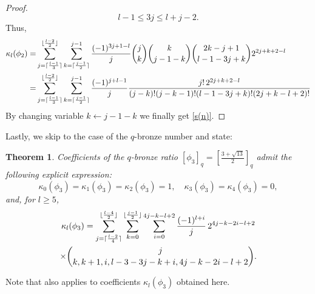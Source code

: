 \documentclass[11pt,reqno]{amsart}
\theoremstyle{plain}
\newtheorem{theoreme}[lemme]{Theorem}
\theoremstyle{definition}
\numberwithin{figure}{section}
\numberwithin{table}{section}
\numberwithin{equation}{section}
\newcommand\ka{\kappa}
\let\fr=\frac
\DeclarePairedDelimiter{\ceil}{\lceil}{\rceil}%
\DeclarePairedDelimiter{\floor}{\lfloor}{\rfloor}%
\begin{document}
\begin{proof}
\begin{equation*}
l-1≤3j≤l+j-2.
\end{equation*}
Thus,
\begin{align*}
\ka_l(\phi_2)=&\sum_{j=\ceil{\fr{l-1}{3}}}^{\floor{\fr{l-2}{2}}}\sum_{k=\ceil{\fr{j-1}{2}}}^{j-1}
\fr {(-1)^{3j+1-l}}{j}\binom{j}{k}\binom{k}{j-1-k}\binom{2k-j+1}{l-1-3j+k}2^{2j+k+2-l}\\
=&\sum_{j=\ceil{\fr{l-1}{3}}}^{\floor{\fr{l-2}{2}}}\sum_{k=\ceil{\fr{j-1}{2}}}^{j-1}
\fr {(-1)^{j+l-1}}{j}\fr{j!\,2^{2j+k+2-l}}{(j-k)!(j-k-1)!(l-1-3j+k)!(2j+k-l+2)!}
\end{align*}
By changing variable $k\leftarrow j-1-k$ we finally get \eqref{s(n)}.
\end{proof}


Lastly, we skip to the case of the $q$-bronze number and state:

\begin{theoreme}\label{thm:B-coeffs}  
Coefficients of the $q$-bronze ratio $[\phi_3]_q=\left[\frac{3+\sqrt{13}}{2}\right]_q$ admit the following explicit expression:
\begin{equation*}
\ka_0(\phi_3)=\ka_1(\phi_3)=\ka_2(\phi_3)=1,\quad \ka_3(\phi_3)=\ka_4(\phi_3)=0,
\end{equation*}
and,  for  $l≥5$,
\begin{multline}\label{b(n)}
\ka_l(\phi_3)=\sum_{j=\ceil{\fr{l-2}{4}}}^{\floor{\fr{l-4}{2}}} 
\sum_{k=0}^{\floor{\fr{j-1}{2}}}\sum_{i=0}^{4j-k-l+2}
\fr{(-1)^{l+i}}{j}\, 2^{4j-k-2i-l+2}\\
\times\binom{j}{k,k+1,i,l-3-3j-k+i,4j-k-2i-l+2}.
\end{multline}
\end{theoreme}

Note that  also applies to coefficients $\ka_l(\phi_3)$ obtained here.
\end{document}

